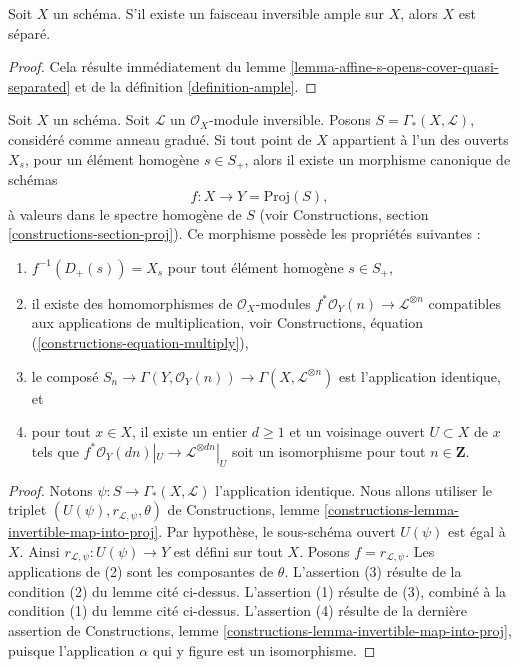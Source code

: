 \begin{lemma}
\label{lemma-ample-separated}
Soit $X$ un schéma. S'il existe un faisceau inversible ample sur $X$,
alors $X$ est séparé.
\end{lemma}

\begin{proof}
Cela résulte immédiatement du
lemme \ref{lemma-affine-s-opens-cover-quasi-separated} et de la
définition \ref{definition-ample}.
\end{proof}

\begin{lemma}
\label{lemma-map-into-proj}
Soit $X$ un schéma.
Soit $\mathcal{L}$ un $\mathcal{O}_X$-module inversible.
Posons $S = \Gamma_*(X, \mathcal{L})$, considéré comme anneau gradué.
Si tout point de $X$ appartient à l'un des
ouverts $X_s$, pour un élément homogène $s \in S_{+}$, alors
il existe un morphisme canonique de schémas
$$
f : X \longrightarrow Y = \text{Proj}(S),
$$
à valeurs dans le spectre homogène de $S$ (voir
Constructions, section \ref{constructions-section-proj}).
Ce morphisme possède les propriétés suivantes :
\begin{enumerate}
\item $f^{-1}(D_{+}(s)) = X_s$ pour tout élément homogène $s \in S_{+}$,
\item il existe des homomorphismes de $\mathcal{O}_X$-modules
$f^*\mathcal{O}_Y(n) \to \mathcal{L}^{\otimes n}$
compatibles aux applications de multiplication, voir
Constructions, équation (\ref{constructions-equation-multiply}),
\item le composé
$S_n \to \Gamma(Y, \mathcal{O}_Y(n)) \to \Gamma(X, \mathcal{L}^{\otimes n})$
est l'application identique, et
\item pour tout $x \in X$, il existe un entier $d \geq 1$
et un voisinage ouvert $U \subset X$ de $x$
tels que $f^*\mathcal{O}_Y(dn)|_U \to \mathcal{L}^{\otimes dn}|_U$
soit un isomorphisme pour tout $n \in \mathbf{Z}$.
\end{enumerate}
\end{lemma}

\begin{proof}
Notons $\psi : S \to \Gamma_*(X, \mathcal{L})$ l'application identique.
Nous allons utiliser le triplet
$(U(\psi), r_{\mathcal{L}, \psi}, \theta)$ de
Constructions, lemme \ref{constructions-lemma-invertible-map-into-proj}.
Par hypothèse, le sous-schéma ouvert $U(\psi)$ est égal à $X$. Ainsi
$r_{\mathcal{L}, \psi} : U(\psi) \to Y$ est défini sur tout $X$.
Posons $f = r_{\mathcal{L}, \psi}$.
Les applications de (2) sont les composantes de $\theta$.
L'assertion (3) résulte de la condition (2) du lemme cité ci-dessus.
L'assertion (1) résulte de (3), combiné à la condition (1) du lemme
cité ci-dessus. L'assertion (4) résulte de la dernière assertion de
Constructions, lemme \ref{constructions-lemma-invertible-map-into-proj},
puisque l'application $\alpha$ qui y figure est un isomorphisme.
\end{proof}

